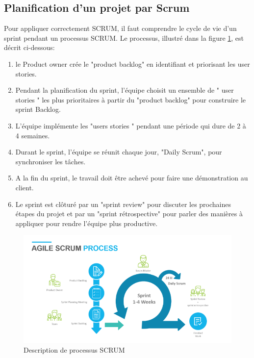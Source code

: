 \subsection[Planification d’un projet par Scrum]{Planification d’un projet par Scrum}
Pour appliquer correctement SCRUM, il faut comprendre le cycle de vie d’un sprint pendant un processus SCRUM. Le processus, illustré dans la figure \ref{fig:scrum}, est décrit ci-dessous: 
\begin{enumerate}[label=\arabic*.]
	\item le Product owner crée le "product backlog" en identifiant et priorisant les user stories.
	\item Pendant la planification du sprint, l’équipe choisit un ensemble de " user stories " les plus prioritaires à partir du "product backlog" pour construire le sprint Backlog. 
	\item L’équipe implémente les "users stories " pendant une période qui dure de 2 à 4 semaines. 
	\item Durant le sprint, l’équipe se réunit chaque jour, "Daily Scrum", pour synchroniser les tâches. 
	\item A la fin du sprint, le travail doit être achevé pour faire une démonstration au client. 
	\item Le sprint est clôturé par un "sprint review" pour discuter les prochaines étapes du projet et par un "sprint rétrospective" pour parler des manières à appliquer pour rendre l’équipe plus productive.
\end{enumerate}
\begin{figure}[H]
	\centering
	\includegraphics[width=0.9\linewidth]{img/scrum}
	\caption[Description de processus SCRUM]{Description de processus SCRUM}
	\label{fig:scrum}
\end{figure}
